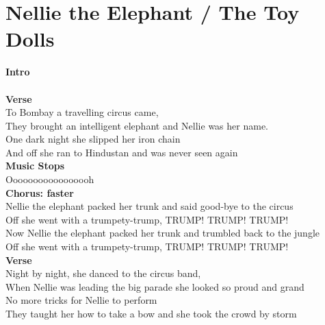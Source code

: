 \section{Nellie the Elephant / The Toy Dolls}\label{sec:nellietheelephant}

\EminorEasy
\Bseven
\Cmajor
\Gmajor
\Bmajor
\FsharpSeven
\EmajorEasy
\Amajor
\BflatMajor
\Fmajor
\Gseven
\Cseven

\textbf{Intro}\\
        \\

\textbf{Verse}\\
To Bombay a travelling circus came,\\
They brought an intelligent elephant and Nellie was her name.\\
One dark night she slipped her iron chain\\
And off she ran to Hindustan and was never seen again\\
\textbf{Music Stops}\\
Ooooooooooooooooh\\
\textbf{Chorus: faster}\\
Nellie the elephant packed her trunk and said good-bye to the circus\\
Off she went with a trumpety-trump, TRUMP! TRUMP! TRUMP!\\
Now Nellie the elephant packed her trunk and trumbled back to the jungle\\
Off she went with a trumpety-trump, TRUMP! TRUMP! TRUMP!\\
\textbf{Verse}\\
Night by night, she danced to the circus band,\\
When Nellie was leading the big parade she looked so proud and grand\\
No more tricks for Nellie to perform\\
They taught her how to take a bow and she took the crowd by storm\\
